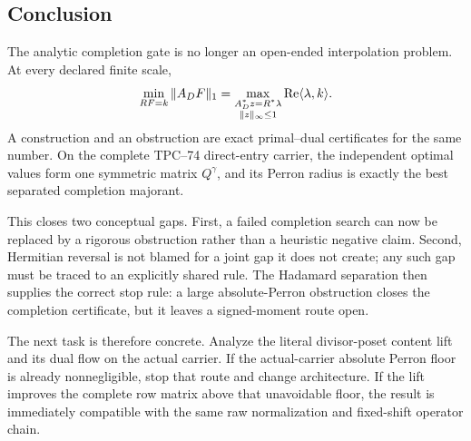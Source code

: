 \subsection{Conclusion}

The analytic completion gate is no longer an open-ended interpolation
problem.  At every declared finite scale,
\[
 \min_{RF=k}\|A_DF\|_1
 =
 \max_{\substack{A_D^*z=R^*\lambda\\\|z\|_\infty\le1}}
 \operatorname{Re}\langle\lambda,k\rangle.
\]
A construction and an obstruction are exact primal--dual certificates
for the same number.  On the complete TPC--74 direct-entry carrier, the
independent optimal values form one symmetric matrix \(Q^\gamma\), and
its Perron radius is exactly the best separated completion majorant.

This closes two conceptual gaps.  First, a failed completion search can
now be replaced by a rigorous obstruction rather than a heuristic
negative claim.  Second, Hermitian reversal is not blamed for a joint
gap it does not create; any such gap must be traced to an explicitly
shared rule.  The Hadamard separation then supplies the correct stop
rule: a large absolute-Perron obstruction closes the completion
certificate, but it leaves a signed-moment route open.

The next task is therefore concrete.  Analyze the literal divisor-poset
content lift and its dual flow on the actual carrier.  If the
actual-carrier absolute Perron floor is already nonnegligible, stop that
route and change architecture.  If the lift improves the complete row
matrix above that unavoidable floor, the result is immediately compatible
with the same raw normalization and fixed-shift operator chain.
